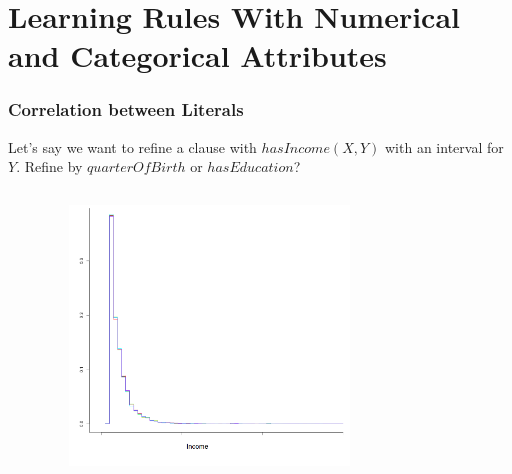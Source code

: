 \documentclass{beamer}
\begin{document}
\section{Learning Rules With Numerical and Categorical Attributes}
\begin{frame}
\frametitle{Correlation between Literals}
Let's say we want to refine a clause with $hasIncome(X,Y)$ with an interval for $Y$.
Refine by $quarterOfBirth$ or $hasEducation$?
\begin{columns}[c]
    \begin{fontsize}{7}{8}
    \end{fontsize}
    \begin{figure}
    \includegraphics[width=1\linewidth]{./Figures/income-birthquarter-zoom.png}
    \end{figure}
    \begin{fontsize}{7}{8}
    \end{fontsize}
    \begin{figure}

\end{figure}
\end{columns}
\end{frame}
\end{document}
